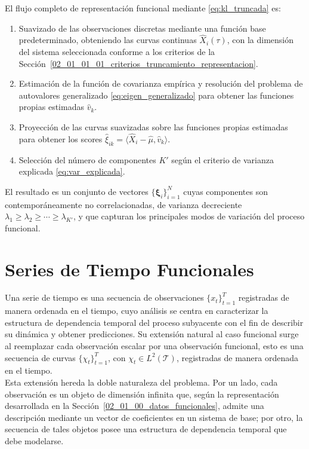 El flujo completo de representación funcional mediante \ref{eq:kl_truncada} es:
\begin{enumerate}
    \item Suavizado de las observaciones discretas mediante una función base predeterminado, obteniendo las curvas continuas $\hat{X}_i(\tau)$, con la dimensión del sistema seleccionada conforme a los criterios de la Sección~\ref{02_01_01_01_criterios_truncamiento_representacion}.
    \item Estimación de la función de covarianza empírica y resolución del problema de autovalores generalizado \eqref{eq:eigen_generalizado} para obtener las funciones propias estimadas $\hat{v}_k$.
    \item Proyección de las curvas suavizadas sobre las funciones propias estimadas para obtener los scores $\hat{\xi}_{ik} = \langle \hat{X}_i - \hat{\mu}, \hat{v}_k \rangle$.
    \item Selección del número de componentes $K'$ según el criterio de varianza explicada \eqref{eq:var_explicada}.
\end{enumerate}

El resultado es un conjunto de vectores $\{\boldsymbol{\xi}_i\}_{i=1}^{N}$ cuyas componentes son contemporáneamente no correlacionadas, de varianza decreciente $\lambda_1 \geq \lambda_2 \geq \cdots \geq \lambda_{K'}$, y que capturan los principales modos de variación del proceso funcional.

\section{Series de Tiempo Funcionales}
\label{02_02_00_series_tiempo_funcionales}
Una serie de tiempo es una secuencia de observaciones $\{x_t\}_{t=1}^{T}$ registradas de manera ordenada en el tiempo, cuyo análisis se centra en caracterizar la estructura de dependencia temporal del proceso subyacente con el fin de describir su dinámica y obtener predicciones. Su extensión natural al caso funcional surge al reemplazar cada observación escalar por una observación funcional, esto es una secuencia de curvas $\{\chi_t\}_{t=1}^{T}$, con $\chi_t \in L^2(\mathcal{T})$, registradas de manera ordenada en el tiempo.\\

Esta extensión hereda la doble naturaleza del problema. Por un lado, cada observación es un objeto de dimensión infinita que, según la representación desarrollada en la Sección~\ref{02_01_00_datos_funcionales}, admite una descripción mediante un vector de coeficientes en un sistema de base; por otro, la secuencia de tales objetos posee una estructura de dependencia temporal que debe modelarse.


